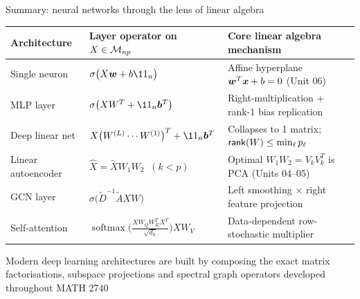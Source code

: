 \documentclass[aspectratio=169]{beamer}\usepackage[]{graphicx}\usepackage[]{xcolor}
\begin{document}


\begin{frame}{Summary: neural networks through the lens of linear algebra}
\begin{center}
{\footnotesize
\setlength{\tabcolsep}{4pt}
\renewcommand{\arraystretch}{1.35}
\begin{tabular}{lll}
\toprule
\textbf{Architecture} & \textbf{Layer operator on $X \in \mathcal{M}_{np}$} & \textbf{Core linear algebra mechanism} \\
\midrule
Single neuron & $\sigma\big(X\bw + b\11_n\big)$ & Affine hyperplane $\bm{w}^T\bm{x} + b = 0$ (Unit 06) \\
MLP layer & $\sigma\big(X W^T + \11_n \bb^T\big)$ & Right-multiplication + rank-1 bias replication \\
Deep linear net & $X \big(W^{(L)}\cdots W^{(1)}\big)^T + \11_n \bb^T$ & Collapses to 1 matrix; $\mathsf{rank}(W) \le \min_\ell p_\ell$ \\
Linear autoencoder & $\hat{X} = \widetilde{X} W_1 W_2 \;\; (k < p)$ & Optimal $W_1 W_2 = V_k V_k^T$ is PCA (Units 04--05) \\
GCN layer & $\sigma\big(\tilde{D}^{-1}\tilde{A} X W\big)$ & Left smoothing $\times$ right feature projection \\
Self-attention & $\operatorname{softmax}\!\big(\frac{XW_QW_K^TX^T}{\sqrt{d_k}}\big) X W_V$ & Data-dependent row-stochastic multiplier \\
\bottomrule
\end{tabular}
}
\end{center}
\vfill
Modern deep learning architectures are built by composing the exact matrix factorisations, subspace projections and spectral graph operators developed throughout MATH 2740
\end{frame}
\end{document}
